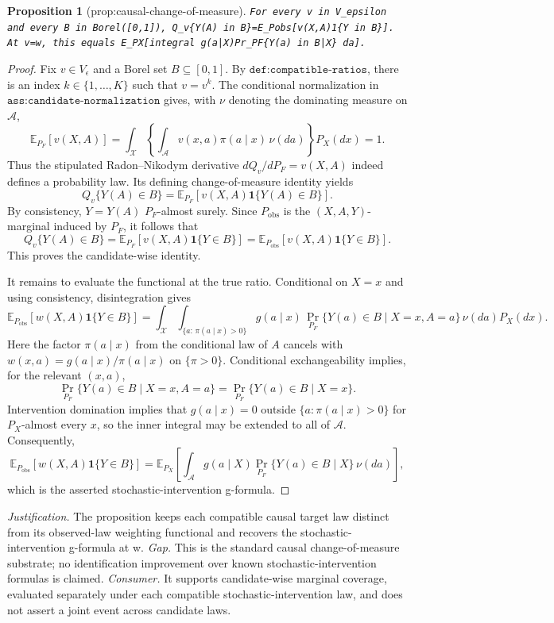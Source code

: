 \documentclass{article}
\newtheorem{proposition}{Proposition}
\begin{document}
\begin{proposition}[prop:causal-change-of-measure]\label{prop:causal-change-of-measure}
\texttt{For every v in V\_epsilon and every B in Borel([0,1]), Q\_v\{Y(A) in B\}=E\_Pobs[v(X,A)1\{Y in B\}]. At v=w, this equals E\_PX[integral g(a|X)Pr\_PF\{Y(a) in B|X\} da].}
\end{proposition}
\begin{proof}
Fix \(v\in V_\epsilon\) and a Borel set \(B\subseteq[0,1]\). By \(\texttt{def:compatible-ratios}\), there is an index \(k\in\{1,\ldots,K\}\) such that \(v=v^k\). The conditional normalization in \(\texttt{ass:candidate-normalization}\) gives, with \(\nu\) denoting the dominating measure on \(\mathcal A\),
\[
\mathbb E_{P_F}[v(X,A)]
=\int_{\mathcal X}\!\left\{\int_{\mathcal A}v(x,a)\pi(a\mid x)\,\nu(da)\right\}P_X(dx)
=1.
\]
Thus the stipulated Radon--Nikodym derivative \(dQ_v/dP_F=v(X,A)\) indeed defines a probability law. Its defining change-of-measure identity yields
\[
Q_v\{Y(A)\in B\}
=\mathbb E_{P_F}\!\left[v(X,A)\mathbf 1\{Y(A)\in B\}\right].
\]
By consistency, \(Y=Y(A)\) \(P_F\)-almost surely. Since \(P_{\mathrm{obs}}\) is the \((X,A,Y)\)-marginal induced by \(P_F\), it follows that
\[
Q_v\{Y(A)\in B\}
=\mathbb E_{P_F}\!\left[v(X,A)\mathbf 1\{Y\in B\}\right]
=\mathbb E_{P_{\mathrm{obs}}}\!\left[v(X,A)\mathbf 1\{Y\in B\}\right].
\]
This proves the candidate-wise identity.

It remains to evaluate the functional at the true ratio. Conditional on \(X=x\) and using consistency, disintegration gives
\[
\mathbb E_{P_{\mathrm{obs}}}\!\left[w(X,A)\mathbf 1\{Y\in B\}\right]
=\int_{\mathcal X}\!\int_{\{a:\,\pi(a\mid x)>0\}}\!g(a\mid x)\,\Pr_{P_F}\{Y(a)\in B\mid X=x,A=a\}\,\nu(da)P_X(dx).
\]
Here the factor \(\pi(a\mid x)\) from the conditional law of \(A\) cancels with \(w(x,a)=g(a\mid x)/\pi(a\mid x)\) on \(\{\pi>0\}\). Conditional exchangeability implies, for the relevant \((x,a)\),
\[
\Pr_{P_F}\{Y(a)\in B\mid X=x,A=a\}
=\Pr_{P_F}\{Y(a)\in B\mid X=x\}.
\]
Intervention domination implies that \(g(a\mid x)=0\) outside \(\{a:\pi(a\mid x)>0\}\) for \(P_X\)-almost every \(x\), so the inner integral may be extended to all of \(\mathcal A\). Consequently,
\[
\mathbb E_{P_{\mathrm{obs}}}\!\left[w(X,A)\mathbf 1\{Y\in B\}\right]
=\mathbb E_{P_X}\!\left[\int_{\mathcal A}g(a\mid X)\Pr_{P_F}\{Y(a)\in B\mid X\}\,\nu(da)\right],
\]
which is the asserted stochastic-intervention g-formula.
\end{proof}
\par\smallskip\noindent \textit{Justification.} The proposition keeps each compatible causal target law distinct from its observed-law weighting functional and recovers the stochastic-intervention g-formula at w. \textit{Gap.} This is the standard causal change-of-measure substrate; no identification improvement over known stochastic-intervention formulas is claimed. \textit{Consumer.} It supports candidate-wise marginal coverage, evaluated separately under each compatible stochastic-intervention law, and does not assert a joint event across candidate laws.
\end{document}

